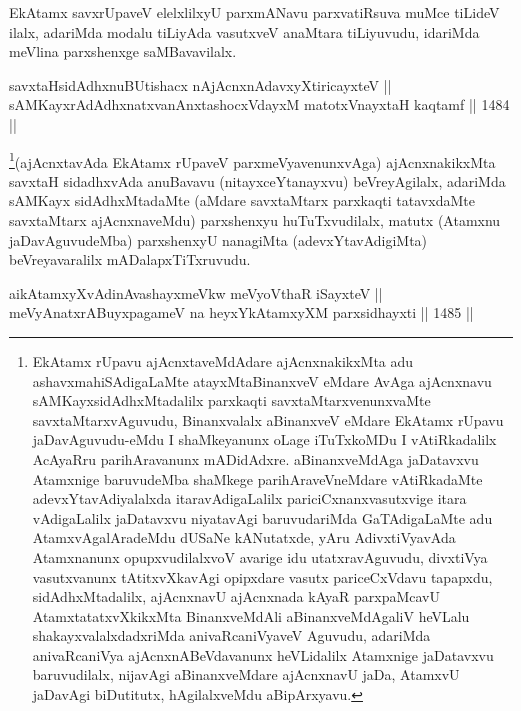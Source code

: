 \begin{artha}
EkAtamx savxrUpaveV elelxlilxyU parxmANavu parxvatiRsuva muMce tiLideV ilalx, adariMda modalu tiLiyAda vasutxveV anaMtara tiLiyuvudu, idariMda meVlina parxshenxge saMBavavilalx.
\end{artha}

\begin{shl}
savxtaHsidAdhxnuBUtishacx nAjAcnxnAdavxyXtiricayxteV || \\
sAMKayxrAdAdhxnatxvanAnxtashocxVdayxM matotxV\s nayxtaH kaqtamf \hfill || 1484 ||  
\end{shl}

\begin{artha}
\footnote{EkAtamx rUpavu ajAcnxtaveMdAdare ajAcnxnakikxMta adu ashavxmahiSAdigaLaMte atayxMtaBinanxveV eMdare AvAga ajAcnxnavu sAMKayxsidAdhxMtadalilx parxkaqti savxtaMtarxvenunxvaMte savxtaMtarxvAguvudu, Binanxvalalx aBinanxveV eMdare EkAtamx rUpavu jaDavAguvudu-eMdu I shaMkeyanunx oLage iTuTxkoMDu I vAtiRkadalilx AcAyaRru parihAravanunx mADidAdxre. aBinanxveMdAga jaDatavxvu Atamxnige baruvudeMba shaMkege parihAraveVneMdare vAtiRkadaMte adevxYtavAdiyalalxda itaravAdigaLalilx pariciCxnanxvasutxvige itara vAdigaLalilx jaDatavxvu niyatavAgi baruvudariMda GaTAdigaLaMte adu AtamxvAgalAradeMdu dUSaNe kANutatxde, yAru AdivxtiVyavAda Atamxnanunx opupxvudilalxvoV avarige idu utatxravAguvudu, divxtiVya vasutxvanunx tAtitxvXkavAgi opipxdare vasutx pariceCxVdavu tapapxdu, sidAdhxMtadalilx, ajAcnxnavU ajAcnxnada kAyaR parxpaMcavU AtamxtatatxvXkikxMta BinanxveMdAli aBinanxveMdAgaliV heVLalu shakayxvalalxdadxriMda anivaRcaniVyaveV Aguvudu, adariMda anivaRcaniVya ajAcnxnABeVdavanunx heVLidalilx Atamxnige jaDatavxvu baruvudilalx, nijavAgi aBinanxveMdare ajAcnxnavU jaDa, AtamxvU jaDavAgi biDutitutx, hAgilalxveMdu aBipArxyavu.}(ajAcnxtavAda EkAtamx rUpaveV parxmeVyavenunxvAga) ajAcnxnakikxMta savxtaH sidadhxvAda anuBavavu (nitayxceYtanayxvu) beVreyAgilalx, adariMda sAMKayx sidAdhxMtadaMte (aMdare savxtaMtarx parxkaqti tatavxdaMte savxtaMtarx ajAcnxnaveMdu) parxshenxyu huTuTxvudilalx, matutx (Atamxnu jaDavAguvudeMba) parxshenxyU nanagiMta (adevxYtavAdigiMta) beVreyavaralilx mADalapxTiTxruvudu.
\end{artha}


\begin{shl}
aikAtamxyXvAdinA\s vashayxmeVkw meVyoV\s thaR iSayxteV ||  \\
meVyAnatxrABuyxpagameV na heyxYkAtamxyXM parxsidhayxti \hfill || 1485 ||  
\end{shl}

